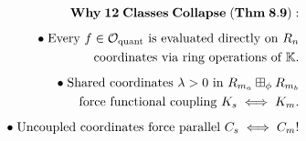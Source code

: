 \documentclass[preview]{standalone}
\begin{document}
\begin{align*}
\special{dvisvgm:raw <g id='unique000'>}\mathbf{Why\;12\;Classes\;Collapse\;(Thm\;8.9):}\\[5pt]\bullet\;\text{Every }f\in\mathcal{O}_{\text{quant}}\text{ is evaluated directly on }R_n\\\;\;\text{coordinates via ring operations of }\mathbb{K}.\\[5pt]\bullet\;\text{Shared coordinates }\lambda > 0\text{ in }R_{m_a}\boxplus_\phi R_{m_b}\\\;\;\text{force functional coupling }K_s\iff K_m.\\[5pt]\bullet\;\text{Uncoupled coordinates force parallel }C_s\iff C_m!\special{dvisvgm:raw </g>}
\end{align*}
\end{document}
